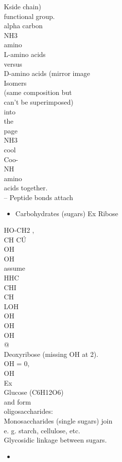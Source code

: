 \documentclass{article}
\begin{document}
Kside chain)\\
functional group.\\
alpha carbon\\
NH3\\
amino\\
L-amino acids\\
versus\\
D-amino acids (mirror image\\
Isomers\\
(same composition but\\
can't be superimposed)\\
into\\
the\\
page\\
NH3\\
cool\\
Coo-\\
NH\\
amino\\
acids together.\\
– Peptide bonds attach
\begin{itemize}
\item  Carbohydrates (sugars)
Ex Ribose
\end{itemize}
HO-CH2 ,\\
CH CÚ\\
OH\\
OH\\
assume\\
HHC\\
CHI\\
CH\\
LOH\\
OH\\
OH\\
OH\\
@\\
Deoxyribose (missing OH at 2).\\
OH = 0,\\
OH\\
Ex\\
Glucose (C6H12O6)\\
and form\\
oligosaccharides:\\
Monosaccharides (single sugars) join\\
e. g. starch, cellulose, etc.\\
Glycosidic linkage between sugars.\\
\begin{itemize}
\item 
\end{itemize}
\end{document}
